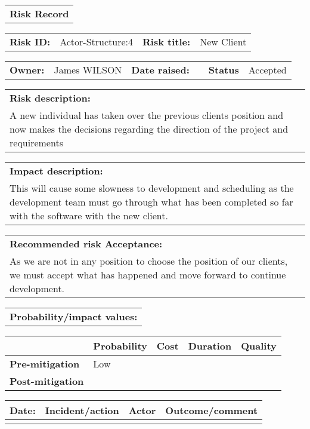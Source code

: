 \begin{table}
	\begin{tabularx}{\textwidth}{| X |}
		\hline
		\textbf{Risk Record} \\
	\end{tabularx}
	\begin{tabularx}{\textwidth}{| l | X | l | X |}
		\hline
		\textbf{Risk ID:} & Actor-Structure:4 & \textbf{Risk title:} & New Client \\
	\end{tabularx}
	\begin{tabularx}{\textwidth}{| l | X | l | X | l | X |}
		\hline
		\textbf{Owner:} & James WILSON & \textbf{Date raised:} &  & \textbf{Status} & Accepted \\
	\end{tabularx}
	\begin{tabularx}{\textwidth}{| X |}
		\hline
		\textbf{Risk description:} \\ A new individual has taken over the previous clients position and now makes the decisions regarding the direction of the project and requirements\\
	\end{tabularx}
	\begin{tabularx}{\textwidth}{| X |}
		\hline
		\textbf{Impact description:} \\ This will cause some slowness to development and scheduling as the development team must go through what has been completed so far with the software with the new client. \\
	\end{tabularx}
	\begin{tabularx}{\textwidth}{| X |}
		\hline
		\textbf{Recommended risk Acceptance:} \\ As we are not in any position to choose the position of our clients, we must accept what has happened and move forward to continue development. \\
	\end{tabularx}
	\begin{tabularx}{\textwidth}{| X |}
		\hline
		\textbf{Probability/impact values:} \\
	\end{tabularx}
	\begin{tabularx}{\textwidth}{| l | l | X | X | X |}
		\hline
		 &  \textbf{Probability} & \textbf{Cost} & \textbf{Duration} & \textbf{Quality} \\ \hline
		\textbf{Pre-mitigation} & Low & & & \\ \hline
		\textbf{Post-mitigation} & & & & \\ \hline \hline
	\end{tabularx}
	\begin{tabularx}{\textwidth}{| l | X | l | X |}
		\hline
		\textbf{Date:} & \textbf{Incident/action} & \textbf{Actor} & \textbf{Outcome/comment} \\ \hline
		 & &  &  \\ \hline
	\end{tabularx}
\end{table}

